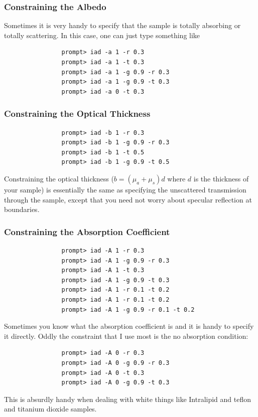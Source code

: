 \documentclass{article}
\begin{document}
\subsubsection{Constraining the Albedo}

Sometimes it is very handy to specify that the sample is totally absorbing
or totally scattering.  In this case, one can just type something like
\begin{verbatim}
                prompt> iad -a 1 -r 0.3
                prompt> iad -a 1 -t 0.3
                prompt> iad -a 1 -g 0.9 -r 0.3
                prompt> iad -a 1 -g 0.9 -t 0.3
                prompt> iad -a 0 -t 0.3
\end{verbatim}

\subsubsection{Constraining the Optical Thickness}

\begin{verbatim}
                prompt> iad -b 1 -r 0.3
                prompt> iad -b 1 -g 0.9 -r 0.3
                prompt> iad -b 1 -t 0.5
                prompt> iad -b 1 -g 0.9 -t 0.5
\end{verbatim}

Constraining the optical thickness ($b=(\mu_a+\mu_s)d$ where $d$ is the 
thickness of your sample) is essentially the same as specifying
the unscattered transmission through the sample, except that you need not
worry about specular reflection at boundaries.

\subsubsection{Constraining the Absorption Coefficient}

\begin{verbatim}
                prompt> iad -A 1 -r 0.3
                prompt> iad -A 1 -g 0.9 -r 0.3
                prompt> iad -A 1 -t 0.3
                prompt> iad -A 1 -g 0.9 -t 0.3
                prompt> iad -A 1 -r 0.1 -t 0.2
                prompt> iad -A 1 -r 0.1 -t 0.2 
                prompt> iad -A 1 -g 0.9 -r 0.1 -t 0.2 
 \end{verbatim}

Sometimes you know what the absorption coefficient is and it is
handy to specify it directly.  Oddly the constraint that I use most
is the no absorption condition:
\begin{verbatim}
                prompt> iad -A 0 -r 0.3
                prompt> iad -A 0 -g 0.9 -r 0.3
                prompt> iad -A 0 -t 0.3
                prompt> iad -A 0 -g 0.9 -t 0.3
 \end{verbatim}
This is absurdly handy when dealing with white things like Intralipid
and teflon and titanium dioxide samples.
\end{document}
